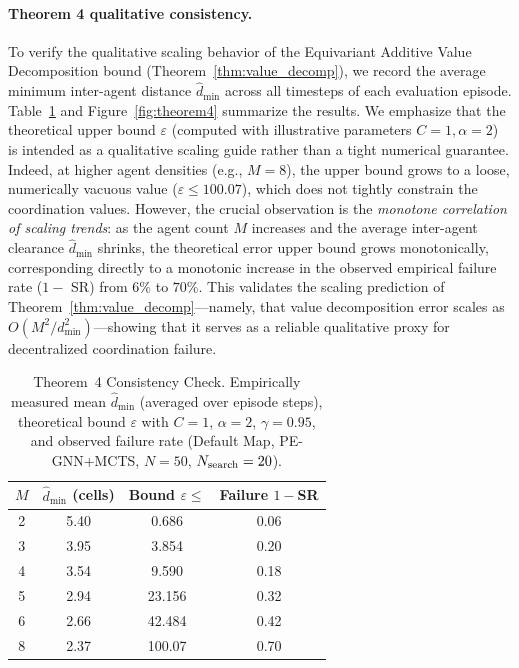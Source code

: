 \documentclass[11pt,a4paper]{article}
\begin{document}
\paragraph{Theorem 4 qualitative consistency.}
To verify the qualitative scaling behavior of the Equivariant Additive Value Decomposition bound (Theorem~\ref{thm:value_decomp}), we record the average minimum inter-agent distance $\hat{d}_{\min}$ across all timesteps of each evaluation episode. Table~\ref{tab:theorem4} and Figure~\ref{fig:theorem4} summarize the results. We emphasize that the theoretical upper bound $\varepsilon$ (computed with illustrative parameters $C=1, \alpha=2$) is intended as a qualitative scaling guide rather than a tight numerical guarantee. Indeed, at higher agent densities (e.g., $M=8$), the upper bound grows to a loose, numerically vacuous value ($\varepsilon \le 100.07$), which does not tightly constrain the coordination values. However, the crucial observation is the \emph{monotone correlation of scaling trends}: as the agent count $M$ increases and the average inter-agent clearance $\hat{d}_{\min}$ shrinks, the theoretical error upper bound grows monotonically, corresponding directly to a monotonic increase in the observed empirical failure rate ($1 -$ SR) from $6\%$ to $70\%$. This validates the scaling prediction of Theorem~\ref{thm:value_decomp}—namely, that value decomposition error scales as $O(M^2 / d_{\min}^2)$—showing that it serves as a reliable qualitative proxy for decentralized coordination failure.

\begin{table}[H]
\begin{center}
\small
\begin{tabular}{|c|c|c|c|}
\hline
$M$ & $\hat{d}_{\min}$ (cells) & Bound $\varepsilon \leq$ & Failure $1-$SR \\
\hline
2 & 5.40 & 0.686 & 0.06 \\
3 & 3.95 & 3.854 & 0.20 \\
4 & 3.54 & 9.590 & 0.18 \\
5 & 2.94 & 23.156 & 0.32 \\
6 & 2.66 & 42.484 & 0.42 \\
8 & 2.37 & 100.07 & 0.70 \\
\hline
\end{tabular}
\end{center}
\caption{Theorem~4 Consistency Check. Empirically measured mean $\hat{d}_{\min}$ (averaged over episode steps), theoretical bound $\varepsilon$ with $C=1$, $\alpha=2$, $\gamma=0.95$, and observed failure rate (Default Map, PE-GNN+MCTS, $N=50$, $N_{\rm search}=20$).}
\label{tab:theorem4}
\end{table}
\end{document}
